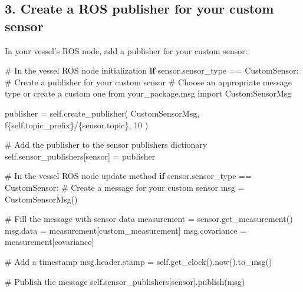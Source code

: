 \documentclass[
  letterpaper,
  DIV=11,
  numbers=noendperiod]{scrreprt}
\newenvironment{Shaded}{\begin{snugshade}}{\end{snugshade}}
\newcommand{\CommentTok}[1]{\textcolor[rgb]{0.37,0.37,0.37}{#1}}
\newcommand{\ControlFlowTok}[1]{\textcolor[rgb]{0.00,0.23,0.31}{\textbf{#1}}}
\newcommand{\DecValTok}[1]{\textcolor[rgb]{0.68,0.00,0.00}{#1}}
\newcommand{\ImportTok}[1]{\textcolor[rgb]{0.00,0.46,0.62}{#1}}
\newcommand{\NormalTok}[1]{\textcolor[rgb]{0.00,0.23,0.31}{#1}}
\newcommand{\OperatorTok}[1]{\textcolor[rgb]{0.37,0.37,0.37}{#1}}
\newcommand{\SpecialCharTok}[1]{\textcolor[rgb]{0.37,0.37,0.37}{#1}}
\newcommand{\SpecialStringTok}[1]{\textcolor[rgb]{0.13,0.47,0.30}{#1}}
\newcommand{\StringTok}[1]{\textcolor[rgb]{0.13,0.47,0.30}{#1}}
\newcommand{\VariableTok}[1]{\textcolor[rgb]{0.07,0.07,0.07}{#1}}
\begin{document}
\subsection*{3. Create a ROS publisher for your custom
sensor}\label{create-a-ros-publisher-for-your-custom-sensor}

In your vessel's ROS node, add a publisher for your custom sensor:

\begin{Shaded}
\begin{Highlighting}[]
\CommentTok{\# In the vessel ROS node initialization}
\ControlFlowTok{if}\NormalTok{ sensor.sensor\_type }\OperatorTok{==} \StringTok{\textquotesingle{}CustomSensor\textquotesingle{}}\NormalTok{:}
    \CommentTok{\# Create a publisher for your custom sensor}
    \CommentTok{\# Choose an appropriate message type or create a custom one}
    \ImportTok{from}\NormalTok{ your\_package.msg }\ImportTok{import}\NormalTok{ CustomSensorMsg}
    
\NormalTok{    publisher }\OperatorTok{=} \VariableTok{self}\NormalTok{.create\_publisher(}
\NormalTok{        CustomSensorMsg,}
        \SpecialStringTok{f\textquotesingle{}}\SpecialCharTok{\{}\VariableTok{self}\SpecialCharTok{.}\NormalTok{topic\_prefix}\SpecialCharTok{\}}\SpecialStringTok{/}\SpecialCharTok{\{}\NormalTok{sensor}\SpecialCharTok{.}\NormalTok{topic}\SpecialCharTok{\}}\SpecialStringTok{\textquotesingle{}}\NormalTok{,}
        \DecValTok{10}
\NormalTok{    )}
    
    \CommentTok{\# Add the publisher to the sensor publishers dictionary}
    \VariableTok{self}\NormalTok{.sensor\_publishers[sensor] }\OperatorTok{=}\NormalTok{ publisher}
    
\CommentTok{\# In the vessel ROS node update method}
\ControlFlowTok{if}\NormalTok{ sensor.sensor\_type }\OperatorTok{==} \StringTok{\textquotesingle{}CustomSensor\textquotesingle{}}\NormalTok{:}
    \CommentTok{\# Create a message for your custom sensor}
\NormalTok{    msg }\OperatorTok{=}\NormalTok{ CustomSensorMsg()}
    
    \CommentTok{\# Fill the message with sensor data}
\NormalTok{    measurement }\OperatorTok{=}\NormalTok{ sensor.get\_measurement()}
\NormalTok{    msg.data }\OperatorTok{=}\NormalTok{ measurement[}\StringTok{\textquotesingle{}custom\_measurement\textquotesingle{}}\NormalTok{]}
\NormalTok{    msg.covariance }\OperatorTok{=}\NormalTok{ measurement[}\StringTok{\textquotesingle{}covariance\textquotesingle{}}\NormalTok{]}
    
    \CommentTok{\# Add a timestamp}
\NormalTok{    msg.header.stamp }\OperatorTok{=} \VariableTok{self}\NormalTok{.get\_clock().now().to\_msg()}
    
    \CommentTok{\# Publish the message}
    \VariableTok{self}\NormalTok{.sensor\_publishers[sensor].publish(msg)}
\end{Highlighting}
\end{Shaded}
\end{document}
